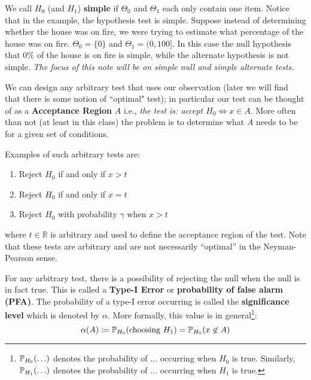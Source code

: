 \documentclass{article}
\begin{document}
We call $H_0$ (and $H_1$) \textbf{simple} if $\Theta_0$ and $\Theta_1$ each only contain one item. Notice that in the example, the hypothesis test is simple. Suppose instead of determining whether the house was on fire, we were trying to estimate what percentage of the house was on fire. $\Theta_0 = \{0 \}$ and $\Theta_1 = (0, 100]$. In this case the null hypothesis that $0\%$ of the house is on fire is simple, while the alternate hypothesis is not simple. \textit{The focus of this note will be on simple null and simple alternate tests.}


We can design any arbitrary test that uses our observation (later we will find that there is some notion of ``optimal" test); in particular our test can be thought of as a \textbf{Acceptance Region} $A$ i.e., \textit{the test is: accept $H_0 \iff x \in A$}. More often than not (at least in this class) the problem is to determine what $A$ needs to be for a given set of conditions.
\begin{example}
Examples of such arbitrary tests are:
\begin{enumerate}
    \item Reject $H_0$ if and only if $x > t$
    \item Reject $H_0$ if and only if $x = t$
    \item Reject $H_0$ with probability $\gamma$ when $x > t$ 
\end{enumerate}
where $t \in \mathbb{R}$ is arbitrary and used to define the acceptance region of the test. Note that these tests are arbitrary and are not necessarily ``optimal'' in the Neyman-Pearson sense.
\end{example}

For any arbitrary test, there is a possibility of rejecting the null when the null is in fact true. This is called a \textbf{Type-I Error} or \textbf{probability of false alarm (PFA)}. The probability of a type-I error occurring is called the \textbf{significance level} which is denoted by $\alpha$. More formally, this value is in general\footnote{$\operatorname{\mathbb{P}}_{H_0}(\ldots)$ denotes the probability of $\ldots$ occurring when $H_0$ is true. Similarly, $\operatorname{\mathbb{P}}_{H_1}(\ldots)$ denotes the probability of $\ldots$ occurring when $H_1$ is true.}:
\[
\alpha(A) \coloneqq \operatorname{\mathbb{P}}_{H_0}(\text{choosing } H_1) = \operatorname{\mathbb{P}}_{H_0}(x \not\in A)
\]
\end{document}
